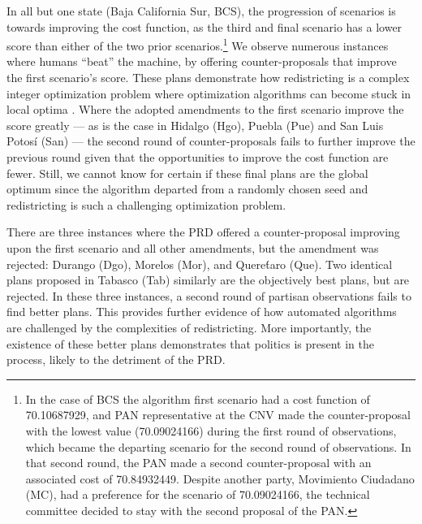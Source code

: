 \documentclass[letter,12pt]{article}
\begin{document}
In all but one state (Baja California Sur, BCS), the progression of scenarios is towards improving the cost function, as the third and final scenario has a lower score than either of the two prior scenarios.\footnote{In the case of BCS the algorithm first scenario had a cost function of 70.10687929, and PAN representative at the CNV made the counter-proposal with the lowest value (70.09024166) during the first round of observations, which became the departing scenario for the second round of observations. In that second round, the PAN made a second counter-proposal with an associated cost of 70.84932449. Despite another party, Movimiento Ciudadano (MC), had a preference for the scenario of 70.09024166, the technical committee decided to stay with the second proposal of the PAN.} We observe numerous instances where humans ``beat'' the machine, by offering counter-proposals that improve the first scenario's score. These plans demonstrate how redistricting is a complex integer optimization problem where optimization algorithms can become stuck in local optima \citep{altman.mcdonald2011bard}. Where the adopted amendments to the first scenario improve the score greatly --- as is the case in Hidalgo (Hgo), Puebla (Pue) and San Luis Potos\'i (San) --- the second round of counter-proposals fails to further improve the previous round given that the opportunities to improve the cost function are fewer. Still, we cannot know for certain if these final plans are the global optimum since the algorithm departed from a randomly chosen seed and redistricting is such a challenging optimization problem.

There are three instances where the PRD offered a counter-proposal improving upon the first scenario and all other amendments, but the amendment was rejected: Durango (Dgo), Morelos (Mor), and Quere\'taro (Que). Two identical plans proposed in Tabasco (Tab) similarly are the objectively best plans, but are rejected. In these three instances, a second round of partisan observations fails to find better plans. This provides further evidence of how automated algorithms are challenged by the complexities of redistricting. More importantly, the existence of these better plans demonstrates that politics is present in the process, likely to the detriment of the PRD.   

\end{document}

